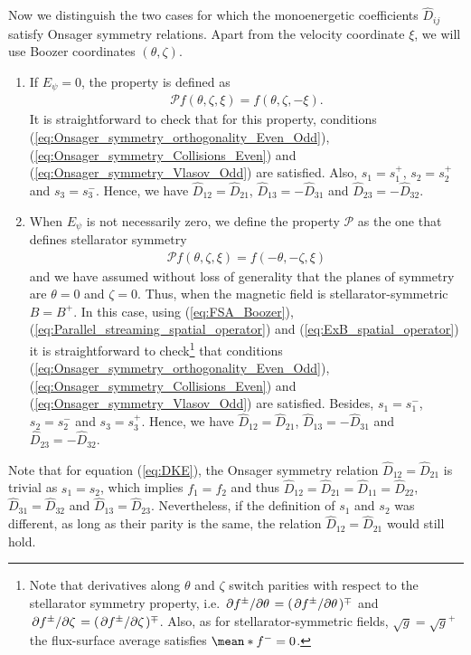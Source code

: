 Now we distinguish the two cases for which the monoenergetic coefficients $\widehat{D}_{ij} $ satisfy Onsager symmetry relations. Apart from the velocity coordinate $\xi$, we will use Boozer coordinates $( {\theta},\zeta)$.
\begin{enumerate}
	\item If $E_\psi=0$, the property is defined as 
	\begin{align}
		\mathcal{P} f( {\theta},\zeta,\xi) = f( {\theta},\zeta,-\xi).
	\end{align}
    It is straightforward to check that for this property, conditions (\ref{eq:Onsager_symmetry_orthogonality_Even_Odd}), (\ref{eq:Onsager_symmetry_Collisions_Even}) and (\ref{eq:Onsager_symmetry_Vlasov_Odd}) are satisfied. Also, $s_1= s_1^+$, $s_2 = s_2^+$ and $s_3 = s_3^-$. Hence, we have $\widehat{D}_{12}=\widehat{D}_{21}$, $\widehat{D}_{13}=-\widehat{D}_{31}$ and $\widehat{D}_{23}=-\widehat{D}_{32}$. 
    
    
    \item When $E_\psi$ is not necessarily zero, we define the property $\mathcal{P}$ as the one that defines stellarator symmetry \cite{DEWAR1998275}
    \begin{align}
    	\mathcal{P} f( {\theta},\zeta,\xi) = f( - {\theta}, - \zeta,\xi)
    \end{align}
    and we have assumed without loss of generality that the planes of symmetry are $\theta=0$ and $ \zeta =0$. Thus, when the magnetic field is stellarator-symmetric $B=B^+$. In this case, using (\ref{eq:FSA_Boozer}), (\ref{eq:Parallel_streaming_spatial_operator}) and (\ref{eq:ExB_spatial_operator}) it is straightforward to check\footnote{Note that derivatives along $\theta$ and $\zeta$ switch parities with respect to the stellarator symmetry property, i.e. $\pdv*{f^\pm}{\theta} = (\pdv*{f^\pm}{\theta} )^\mp$ and $\pdv*{f^\pm}{\zeta} = (\pdv*{f^\pm}{\zeta} )^\mp$. Also, as for stellarator-symmetric fields, $\sqrt{g}=\sqrt{g}^+$ the flux-surface average satisfies $\mean*{f^-}=0$.} that conditions (\ref{eq:Onsager_symmetry_orthogonality_Even_Odd}), (\ref{eq:Onsager_symmetry_Collisions_Even}) and (\ref{eq:Onsager_symmetry_Vlasov_Odd}) are satisfied. Besides, $s_1=s_1^-$, $s_2 = s_2^-$ and $s_3 = s_3^+$. Hence, we have $\widehat{D}_{12}=\widehat{D}_{21}$, $\widehat{D}_{13}=-\widehat{D}_{31}$ and $\widehat{D}_{23}=-\widehat{D}_{32}$. 
\end{enumerate}

Note that for equation (\ref{eq:DKE}), the Onsager symmetry relation $\widehat{D}_{12}=\widehat{D}_{21}$ is trivial as $s_1=s_2$, which implies $f_1=f_2$ and thus $\widehat{D}_{12}=\widehat{D}_{21} = \widehat{D}_{11}= \widehat{D}_{22} $, $\widehat{D}_{31} = \widehat{D}_{32}$ and $\widehat{D}_{13} = \widehat{D}_{23}$. Nevertheless, if the definition of $s_1$ and $s_2$ was different, as long as their parity is the same, the relation $\widehat{D}_{12}=\widehat{D}_{21}$ would still hold.
 